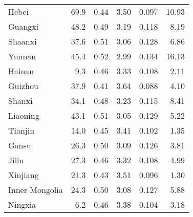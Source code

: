 \begin{tabular}{lrrrrr}
 Hebei          &       69.9 &  0.44 &                   3.50 &                              0.097 &       10.93 \\
 Guangxi        &       48.2 &  0.49 &                   3.19 &                              0.118 &        8.19 \\
 Shaanxi        &       37.6 &  0.51 &                   3.06 &                              0.128 &        6.86 \\
 Yunnan         &       45.4 &  0.52 &                   2.99 &                              0.134 &       16.13 \\
 Hainan         &        9.3 &  0.46 &                   3.33 &                              0.108 &        2.11 \\
 Guizhou        &       37.9 &  0.41 &                   3.64 &                              0.088 &        4.10 \\
 Shanxi         &       34.1 &  0.48 &                   3.23 &                              0.115 &        8.41 \\
 Liaoning       &       43.1 &  0.51 &                   3.05 &                              0.129 &        5.22 \\
 Tianjin        &       14.0 &  0.45 &                   3.41 &                              0.102 &        1.35 \\
 Gansu          &       26.3 &  0.50 &                   3.09 &                              0.126 &        3.81 \\
 Jilin          &       27.3 &  0.46 &                   3.32 &                              0.108 &        4.99 \\
 Xinjiang       &       21.3 &  0.43 &                   3.51 &                              0.096 &        1.30 \\
 Inner Mongolia &       24.3 &  0.50 &                   3.08 &                              0.127 &        5.88 \\
 Ningxia        &        6.2 &  0.46 &                   3.38 &                              0.104 &        3.18 \\
\hline
\end{tabular}